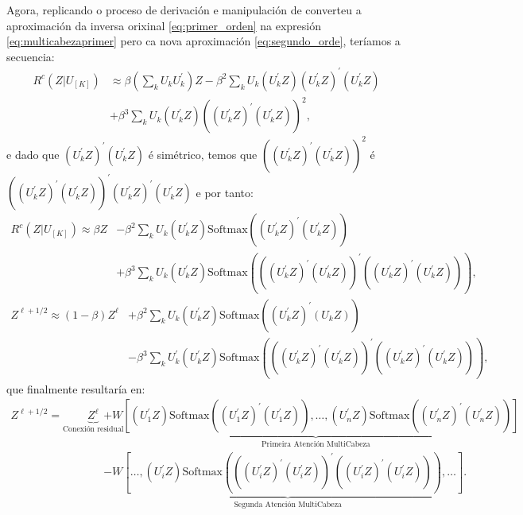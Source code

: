 Agora, replicando o proceso de derivación e manipulación de converteu a aproximación da inversa orixinal \ref{eq:primer_orden} na expresión \ref{eq:multicabezaprimer} pero ca nova aproximación \ref{eq:segundo_orde}, teríamos a secuencia:
\[\begin{aligned}R^c (Z | U_{[K]}) &\approx \beta (\sum_kU_k U_k^{'})Z-\beta^{2} \sum_k U_k (U_k^{'}Z)(U_k^{'} Z)^{'}(U_k^{'} Z) \\
&+\beta^{3} \sum_k U_k (U_k^{'}Z)((U_k^{'} Z)^{'}(U_k^{'} Z))^2, \end{aligned} \tag{3.b}\]
e dado que $(U_k^{'} Z)^{'}(U_k^{'} Z)$ é simétrico, temos que $((U_k^{'} Z)^{'}(U_k^{'} Z))^2$ é  $((U_k^{'} Z)^{'}(U_k^{'} Z))^{'}(U_k^{'} Z)^{'}(U_k^{'} Z)$  e por tanto:
\[\begin{aligned}R^c (Z | U_{[K]}) \approx \beta Z&-\beta^{2} \sum_k U_k (U_k^{'}Z)\text{Softmax}((U_k^{'} Z)^{'}(U_k^{'} Z)) \\ &+\beta^{3} \sum_k U_k (U_k^{'}Z)\text{Softmax}(((U_k^{'} Z)^{'}(U_k^{'} Z))^{'}((U_k^{'} Z)^{'}(U_k^{'} Z))), \end{aligned}\tag{4.b}\]
\[\begin{aligned}Z^{\ell+1/2} \approx (1-\beta)Z^\ell &+ \beta^{2} \sum_k U_k (U_k^{'}Z)\text{Softmax}((U_k^{'} Z)^{'}(U_k Z)) \\ &-\beta^{3} \sum_k U_k^{'} (U_k^{'}Z)\text{Softmax}(((U_k^{'} Z)^{'}(U_k^{'} Z))^{'}((U_k^{'} Z)^{'}(U_k^{'} Z))), \end{aligned}\tag{5.b}\]
que finalmente resultaría en:
\[\begin{aligned}Z^{\ell+1/2} = \underbrace{Z^\ell}_{\text{Conexión residual}} &+  \underbrace{W[(U_1^{'}Z)\text{Softmax}((U_1^{'} Z)^{'}(U_1^{'} Z)), \dots ,(U_n^{'}Z)\text{Softmax}((U_n^{'} Z)^{'}(U_n^{'} Z))]}_{\text{Primeira Atención MultiCabeza}} \\ &-\underbrace{W[\dots, (U_i^{'}Z)\text{Softmax}(((U_i^{'} Z)^{'}(U_i^{'} Z))^{'}((U_i^{'} Z)^{'}(U_i^{'} Z))), \dots ]}_{\text{Segunda Atención MultiCabeza}}  .\end{aligned} \tag{6.b} \label{eq:multicabezasegundo}\]

